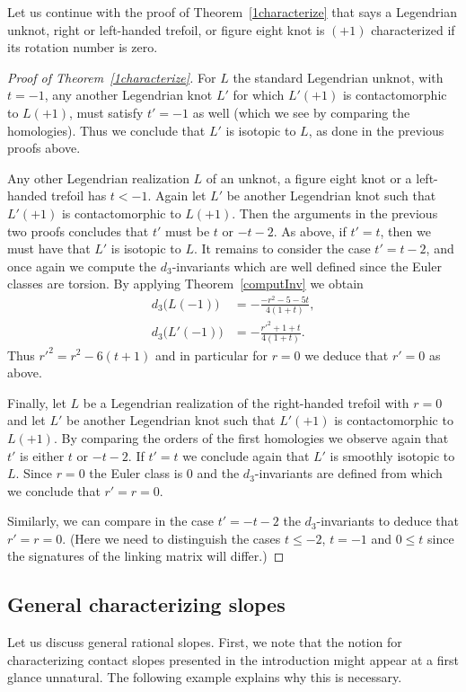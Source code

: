 \documentclass[11pt]{amsart} %
\theoremstyle{plain}
\theoremstyle{definition}
\begin{document}
Let us continue with the proof of Theorem~\ref{1characterize} that says a Legendrian unknot, right or left-handed trefoil, or figure eight knot is $(+1)$ characterized if its rotation number is zero.

\begin{proof}[Proof of Theorem~\ref{1characterize}]
	For $L$ the standard Legendrian unknot, with $t=-1$, any another Legendrian knot $L'$ for which $L'(+1)$ is contactomorphic to $L(+1)$, must satisfy $t'=-1$ as well (which we see by comparing the homologies). Thus we conclude that $L'$ is isotopic to $L$, as done in the previous proofs above. 
	
	Any other Legendrian realization $L$ of an unknot, a figure eight knot or a left-handed trefoil has $t<-1$. Again let $L'$ be another Legendrian knot such that $L'(+1)$ is contactomorphic to $L(+1)$. Then the arguments in the previous two proofs concludes that $t'$ must be $t$ or $-t-2$. As above, if $t'=t$, then we must have that $L'$ is isotopic to $L$. It remains to consider the case $t'=t-2$, and once again we compute the $d_3$-invariants which are well defined since the Euler classes are torsion. By applying Theorem~\ref{computInv} we obtain
	\begin{align*}
	d_3\big(L(-1)\big)&= -\frac{-r^2-5-5t}{4(1+t)},\\
	d_3\big(L'(-1)\big)&= -\frac{{r'}^2+1+t}{4(1+t)}.
	\end{align*}
	Thus ${r'}^2=r^2-6(t+1)$ and in particular for $r=0$ we deduce that $r'=0$ as above.
	
	Finally, let $L$ be a Legendrian realization of the right-handed trefoil with $r=0$ and let $L'$ be another Legendrian knot such that $L'(+1)$ is contactomorphic to $L(+1)$. By comparing the orders of the first homologies we observe again that $t'$ is either $t$ or $-t-2$. If $t'=t$ we conclude again that $L'$ is smoothly isotopic to $L$. Since $r=0$ the Euler class is $0$ and the $d_3$-invariants are defined from which we conclude that $r'=r=0$.
	
	Similarly, we can compare in the case $t'=-t-2$ the $d_3$-invariants to deduce that $r'=r=0$. (Here we need to distinguish the cases $t\leq-2$, $t=-1$ and $0\leq t$ since the signatures of the linking matrix will differ.) 
\end{proof}

\subsection{General characterizing slopes}\label{ssec:characterizing_general}
Let us discuss general rational slopes. First, we note that the notion for characterizing contact slopes presented in the introduction might appear at a first glance unnatural. The following example explains why this is necessary.
\end{document}
